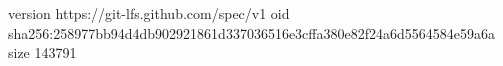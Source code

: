 version https://git-lfs.github.com/spec/v1
oid sha256:258977bb94d4db902921861d337036516e3cffa380e82f24a6d5564584e59a6a
size 143791
